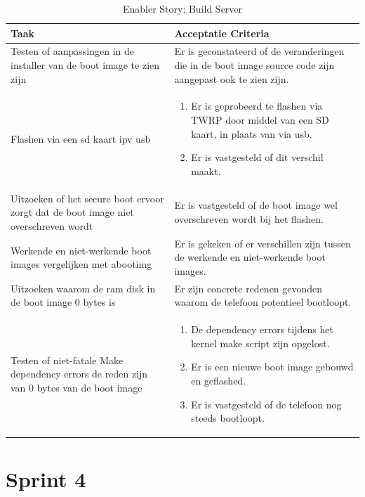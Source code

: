 \documentclass[a4paper]{report}
\begin{document}
\begin{tcolorbox}
  \begin{table}[H]
      \centering
    \begin{tabularx}{1\textwidth}{|X|X|}
      \hline
      \cellcolor[HTML]{ffcc99} \textbf{Taak} & \cellcolor[HTML]{ffcc99} \textbf{Acceptatie Criteria} \\ 
      \hline
      Testen of aanpassingen in de installer van de boot image te zien zijn & Er is geconstateerd of de veranderingen die in de boot image source code zijn aangepast ook te zien zijn. \\ 
      \hline 
      Flashen via een sd kaart ipv usb &
      \begin{enumerate}
        \item Er is geprobeerd te flashen via TWRP door middel van een SD kaart, in plaats van via usb.
        \item Er is vastgesteld of dit verschil maakt.
      \end{enumerate} \\
      \hline
      Uitzoeken of het secure boot ervoor zorgt dat de boot image niet overschreven wordt & Er is vastgesteld of de boot image wel overschreven wordt bij het flashen. \\ 
      \hline 
      Werkende en niet-werkende boot images vergelijken met abootimg & Er is gekeken of er verschillen zijn tussen de werkende en niet-werkende boot images. \\
      \hline 
      Uitzoeken waarom de ram disk in de boot image 0 bytes is & Er zijn concrete redenen gevonden waarom de telefoon potentieel bootloopt. \\ 
      \hline
      Testen of niet-fatale Make dependency errors de reden zijn van 0 bytes van de boot image & 
      \begin{enumerate}
        \item De dependency errors tijdens het kernel make script zijn opgelost.
        \item Er is een nieuwe boot image gebouwd en geflashed.
        \item Er is vastgesteld of de telefoon nog steeds bootloopt.
      \end{enumerate} \\
      \hline
    \end{tabularx}
    \caption{Enabler Story: Build Server}
  \label{table:it3:story_buildserver}
  \end{table}
  \end{tcolorbox}

\chapter{Sprint 4}
\end{document}
